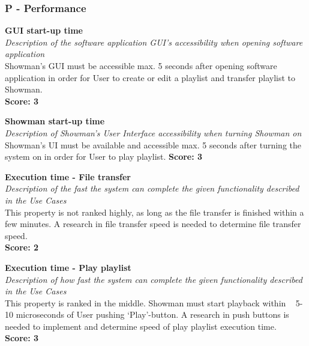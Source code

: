 \subsubsection{\textbf{P} - Performance}
\textbf{GUI start-up time} \\
\textit{Description of the software application GUI's accessibility when opening software application} \\
Showman's GUI must be accessible max. 5 seconds after opening software application in order for User to create or edit a playlist and transfer playlist to Showman. \\
\textbf{Score: 3} \newline

\textbf{Showman start-up time} \\
\textit{Description of Showman's User Interface accessibility when turning Showman on} \\
Showman's UI must be available and accessible max. 5 seconds after turning the system on in order for User to play playlist. \newline
\textbf{Score: 3} \newline

\textbf{Execution time - File transfer} \\
\textit{Description of the fast the system can complete the given functionality described in the Use Cases} \\
This property is not ranked highly, as long as the file transfer is finished within a few minutes. A research in file transfer speed is needed to determine file transfer speed. \\
\textbf{Score: 2} \newline

\textbf{Execution time - Play playlist} \\
\textit{Description of how fast the system can complete the given functionality described in the Use Cases} \\
This property is ranked in the middle. Showman must start playback within ~ 5-10 microseconds of User pushing `Play'-button. A research in push buttons is needed to implement and determine speed of play playlist execution time. \\
\textbf{Score: 3} \\

